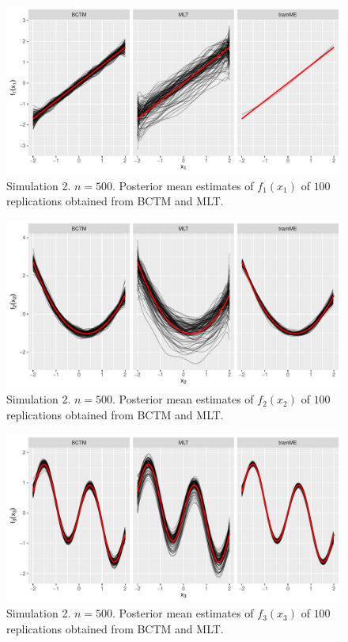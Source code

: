 \documentclass[12pt, a4paper]{article}
\begin{document}
\begin{figure}[!ht]
\begin{center}
\includegraphics[width=\textwidth]{figs/coverage_f1_n500_wtramme.pdf}
\caption{\footnotesize Simulation 2. $n=500$. Posterior mean estimates of $f_1(x_1)$ of $100$ replications obtained from BCTM and MLT.}\label{fig:eff1_n500}
\end{center}
\end{figure}

\begin{figure}[!ht]
\begin{center}
\includegraphics[width=\textwidth]{figs/coverage_f2_n500_wtramme.pdf}
\caption{\footnotesize Simulation 2. $n=500$. Posterior mean estimates of $f_2(x_2)$ of $100$ replications obtained from BCTM and MLT.}\label{fig:eff2_n500}
\end{center}
\end{figure}

\begin{figure}[!ht]
\centering
\includegraphics[width=\textwidth]{figs/coverage_f3_n500_wtramme.pdf}
\caption{\footnotesize Simulation 2. $n=500$. Posterior mean estimates of $f_3(x_3)$ of $100$ replications obtained from BCTM and MLT.}\label{fig:eff3_n500}
\end{figure}
\end{document}
